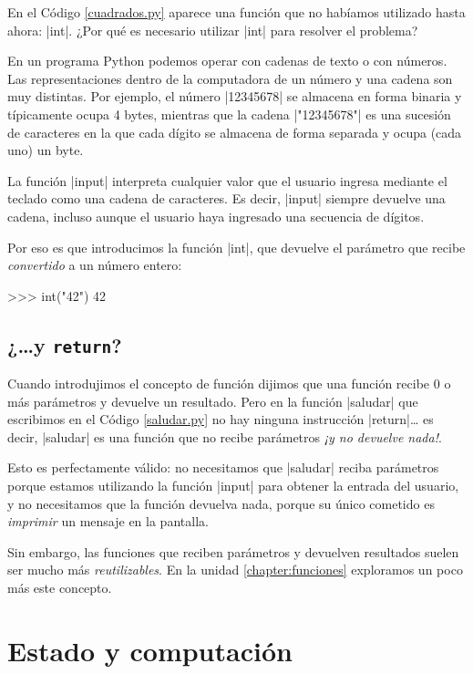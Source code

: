En el Código \ref{cuadrados.py} aparece una función que no habíamos
utilizado hasta ahora: |int|. ¿Por qué es necesario utilizar |int| para
resolver el problema?

En un programa Python podemos operar con cadenas de texto o con números.  Las
representaciones dentro de la computadora de un número y una cadena son muy
distintas. Por ejemplo, el número |12345678| se almacena en forma binaria y
típicamente ocupa 4 bytes, mientras que la cadena |"12345678"| es una sucesión
de caracteres en la que cada dígito se almacena de forma separada y ocupa (cada
uno) un byte.

La función |input| interpreta cualquier valor que el usuario ingresa mediante
el teclado como una cadena de caracteres. Es decir, |input| siempre devuelve
una cadena, incluso aunque el usuario haya ingresado una secuencia de dígitos.

Por eso es que introducimos la función |int|, que devuelve el parámetro que
recibe {\it convertido} a un número entero:

\begin{codigo-python-sn}
>>> int("42")
42
\end{codigo-python-sn}

\subsection*{¿\ldots y \verb|return|?}

Cuando introdujimos el concepto de función dijimos que una función recibe 0 o
más parámetros y devuelve un resultado. Pero en la función |saludar| que
escribimos en el Código \ref{saludar.py} no hay ninguna instrucción
|return|\ldots
es decir, |saludar| es una función que no recibe parámetros {\it ¡y no devuelve
nada!}.

Esto es perfectamente válido: no necesitamos que |saludar| reciba parámetros
porque estamos utilizando la función |input| para obtener la entrada del
usuario, y no necesitamos que la función devuelva nada, porque su único
cometido es {\it imprimir} un mensaje en la pantalla.

Sin embargo, las funciones que reciben parámetros y devuelven resultados suelen
ser mucho más {\it reutilizables}. En la unidad \ref{chapter:funciones}
exploramos un poco más este concepto.

%
%
\clearpage

\section{Estado y computación}

